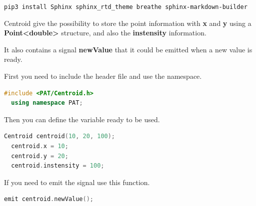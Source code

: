 \texttt{pip3\ install\ Sphinx\ sphinx\_rtd\_theme\ breathe\ sphinx-markdown-builder}


Centroid give the possibility to store the point information with
\textbf{x} and \textbf{y} using a
\textbf{Point\textless double\textgreater{}} structure, and also the
\textbf{instensity} information.

It also contains a signal \textbf{newValue} that it could be emitted
when a new value is ready.

First you need to include the header file and use the namespace.

\begin{lstlisting}[language=c++, gobble=2]
  #include <PAT/Centroid.h>
  using namespace PAT;
\end{lstlisting}

Then you can define the variable ready to be used.

\begin{lstlisting}[language=c++, gobble=2]
  Centroid centroid(10, 20, 100);
  centroid.x = 10;
  centroid.y = 20;
  centroid.instensity = 100;
\end{lstlisting}

If you need to emit the signal use this function.

\begin{lstlisting}[language=c++, gobble=2]
  emit centroid.newValue();
\end{lstlisting}


